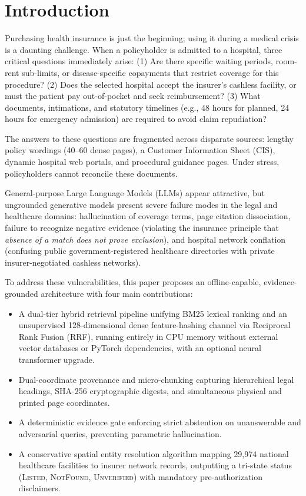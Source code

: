 \documentclass[conference]{IEEEtran}
\begin{document}
\section{Introduction}
Purchasing health insurance is just the beginning; using it during a medical crisis is a daunting challenge. When a policyholder is admitted to a hospital, three critical questions immediately arise: (1) Are there specific waiting periods, room-rent sub-limits, or disease-specific copayments that restrict coverage for this procedure? (2) Does the selected hospital accept the insurer's cashless facility, or must the patient pay out-of-pocket and seek reimbursement? (3) What documents, intimations, and statutory timelines (e.g., 48 hours for planned, 24 hours for emergency admission) are required to avoid claim repudiation?

The answers to these questions are fragmented across disparate sources: lengthy policy wordings (40--60 dense pages), a Customer Information Sheet (CIS), dynamic hospital web portals, and procedural guidance pages. Under stress, policyholders cannot reconcile these documents.

General-purpose Large Language Models (LLMs) appear attractive, but ungrounded generative models present severe failure modes in the legal and healthcare domains: hallucination of coverage terms, page citation dissociation, failure to recognize negative evidence (violating the insurance principle that \textit{absence of a match does not prove exclusion}), and hospital network conflation (confusing public government-registered healthcare directories with private insurer-negotiated cashless networks).

To address these vulnerabilities, this paper proposes an offline-capable, evidence-grounded architecture with four main contributions:
\begin{itemize}
    \item A dual-tier hybrid retrieval pipeline unifying BM25 lexical ranking and an unsupervised 128-dimensional dense feature-hashing channel via Reciprocal Rank Fusion (RRF), running entirely in CPU memory without external vector databases or PyTorch dependencies, with an optional neural transformer upgrade.
    \item Dual-coordinate provenance and micro-chunking capturing hierarchical legal headings, SHA-256 cryptographic digests, and simultaneous physical and printed page coordinates.
    \item A deterministic evidence gate enforcing strict abstention on unanswerable and adversarial queries, preventing parametric hallucination.
    \item A conservative spatial entity resolution algorithm mapping 29,974 national healthcare facilities to insurer network records, outputting a tri-state status (\textsc{Listed}, \textsc{NotFound}, \textsc{Unverified}) with mandatory pre-authorization disclaimers.
\end{itemize}
\end{document}
